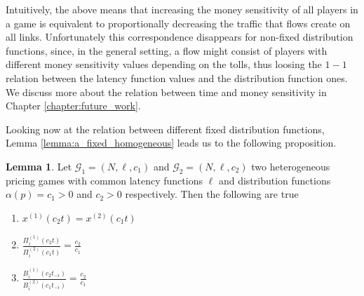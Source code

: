 \documentclass[10pt,a4paper]{book}
\newcommand{\Gm}{\mathcal{G}}
\theoremstyle{definition}
\newtheorem{lemma}[definition]{Lemma}
\theoremstyle{comment}
\begin{document}
Intuitively, the above means that increasing the money sensitivity of all players in a game is equivalent to proportionally decreasing the traffic that flows create on all links.
Unfortunately this correspondence  disappears for non-fixed distribution functions, since, in the general setting, a flow might consist of players with different money sensitivity values depending on the tolls, thus loosing the $1-1$ relation between the latency function values and the distribution function ones.
We discuss more about the relation between time and money sensitivity in Chapter \ref{chapter:future_work}.

Looking now at the relation between different fixed distribution functions, Lemma \ref{lemma:a_fixed_homogeneous} leads us to the following proposition.
\begin{lemma}
	\label{lemma:a_fixed_c_relation}
	Let $\Gm_1 = (N, \ell, c_1)$ and $\Gm_2 = (N, \ell, c_2)$ two heterogeneous pricing games with common latency functions $\ell$ and distribution functions $\alpha(p) = c_1 > 0$ and $c_2 > 0$ respectively.
	Then the following are true
	\begin{enumerate}[$(i)$]
		\item $x^{(1)}(c_2 t) = x^{(2)}(c_1 t)$
		\item $\frac{\Pi_i^{(1)}(c_2 t)}{\Pi_i^{(2)}(c_1 t)} = \frac{c_2}{c_1}$
		\item $\frac{B_i^{(1)}(c_2t_{-i})}{B_i^{(2)}(c_1 t_{-i})} = \frac{c_2}{c_1}$
	\end{enumerate}
\end{lemma}
\end{document}
